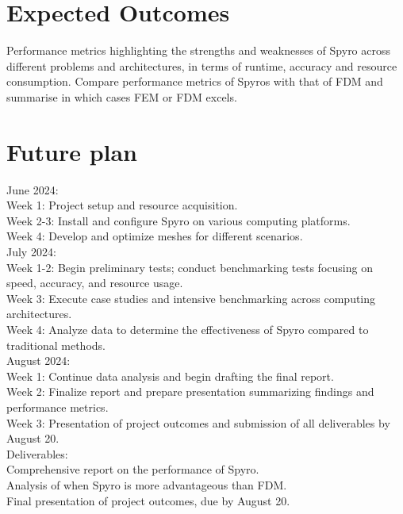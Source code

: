 \documentclass[project-plan]{report-template}
\begin{document}



\section{Expected \space Outcomes}
Performance metrics highlighting the strengths and weaknesses of Spyro across different problems and architectures, in terms of runtime, accuracy and resource consumption. Compare performance metrics of Spyros with that of FDM and summarise in which cases FEM or FDM excels.

\section{Future \space plan}
June 2024: \\
Week 1: Project setup and resource acquisition. \\
Week 2-3: Install and configure Spyro on various computing platforms. \\
Week 4: Develop and optimize meshes for different scenarios. \\
July 2024: \\
Week 1-2: Begin preliminary tests; conduct benchmarking tests focusing on speed, accuracy, and resource usage. \\
Week 3: Execute case studies and intensive benchmarking across computing architectures. \\
Week 4: Analyze data to determine the effectiveness of Spyro compared to traditional methods. \\
August 2024: \\
Week 1: Continue data analysis and begin drafting the final report. \\
Week 2: Finalize report and prepare presentation summarizing findings and performance metrics. \\
Week 3: Presentation of project outcomes and submission of all deliverables by August 20. \\
Deliverables: \\
Comprehensive report on the performance of Spyro. \\
Analysis of when Spyro is more advantageous than FDM. \\
Final presentation of project outcomes, due by August 20. \\



\end{document}
